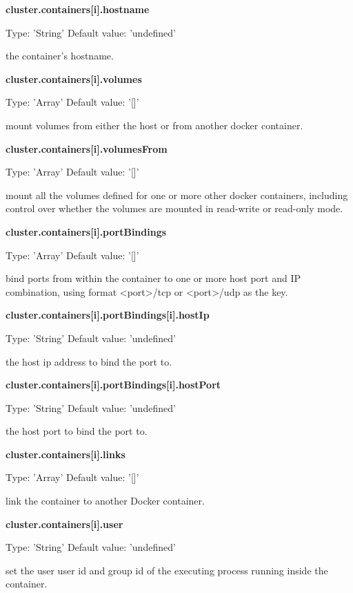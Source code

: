 \documentclass[a4paper,11pt,twoside]{report}
\begin{document}
\begin{appendices}
\noindent
\textbf{cluster.containers[i].hostname}

\noindent
Type: 'String' Default value: 'undefined'\smallskip

\noindent 
the container's hostname.\bigskip

\noindent
\textbf{cluster.containers[i].volumes}

\noindent
Type: 'Array' Default value: '[]'\smallskip

\noindent 
mount volumes from either the host or from another docker container.\bigskip

\noindent
\textbf{cluster.containers[i].volumesFrom}

\noindent
Type: 'Array' Default value: '[]'\smallskip

\noindent 
mount all the volumes defined for one or more other docker containers, including control over whether the volumes are mounted in read-write or read-only mode.\bigskip

\noindent
\textbf{cluster.containers[i].portBindings}

\noindent
Type: 'Array' Default value: '[]'\smallskip

\noindent 
bind ports from within the container to one or more host port and IP combination, using format <port>/tcp or <port>/udp as the key.\bigskip

\noindent
\textbf{cluster.containers[i].portBindings[i].hostIp}

\noindent
Type: 'String' Default value: 'undefined'\smallskip

\noindent 
the host ip address to bind the port to.\bigskip

\noindent
\textbf{cluster.containers[i].portBindings[i].hostPort}

\noindent
Type: 'String' Default value: 'undefined'\smallskip

\noindent 
the host port to bind the port to.\bigskip

\noindent
\textbf{cluster.containers[i].links}

\noindent
Type: 'Array' Default value: '[]'\smallskip

\noindent 
link the container to another Docker container.\bigskip

\noindent
\textbf{cluster.containers[i].user}

\noindent
Type: 'String' Default value: 'undefined'\smallskip

\noindent 
set the user user id and group id of the executing process running inside the container.\bigskip


\end{appendices}
\end{document}
